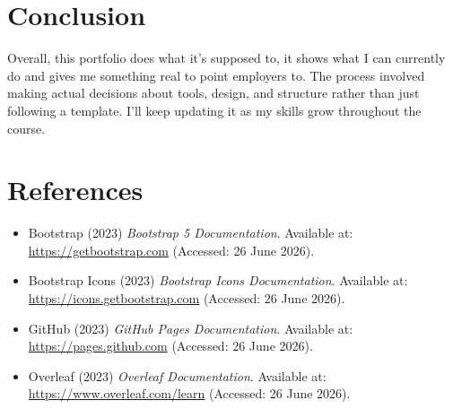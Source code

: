 \documentclass[12pt, a4paper]{article}
\begin{document}
\section{Conclusion}

Overall, this portfolio does what it's supposed to, it shows what I can currently do and gives me something real to point employers to. The process involved making actual decisions about tools, design, and structure rather than just following a template. I'll keep updating it as my skills grow throughout the course.

\section*{References}

\begin{itemize}[noitemsep, label={}]
    \item Bootstrap (2023) \textit{Bootstrap 5 Documentation}. Available at: \url{https://getbootstrap.com} (Accessed: 26 June 2026).
    \item Bootstrap Icons (2023) \textit{Bootstrap Icons Documentation}. Available at: \url{https://icons.getbootstrap.com} (Accessed: 26 June 2026).
    \item GitHub (2023) \textit{GitHub Pages Documentation}. Available at: \url{https://pages.github.com} (Accessed: 26 June 2026).
    \item Overleaf (2023) \textit{Overleaf Documentation}. Available at: \url{https://www.overleaf.com/learn} (Accessed: 26 June 2026).
\end{itemize}
\end{document}
